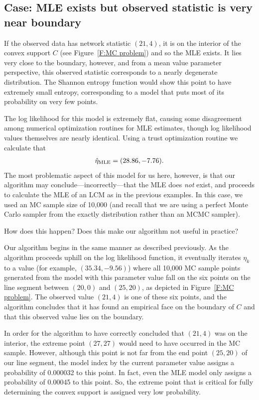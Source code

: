 \subsection{Case: MLE exists but observed statistic is very near boundary} 
\label{S:Example:9node problematic point}
If the observed data has network statistic $(21, 4)$, it is on the interior of 
the convex support $C$ (see Figure~\ref{F:MC problem}) and so the MLE exists.
It lies very close to the boundary, however, and from a mean value parameter 
perspective, this observed statistic 
corresponds to a nearly degenerate distribution. The Shannon entropy function would show this 
point to have extremely small entropy, corresponding to a model that puts most of its 
probability on very few points.

The log likelihood for this model is extremely flat, causing some disagreement among 
numerical optimization routines for MLE estimates, though log likelihood values 
themselves are nearly identical.  Using a trust optimization routine we calculate that 
\begin{align*}
\hat{\eta}_{\textrm{MLE}} = (28.86, -7.76).
\end{align*}
The most problematic aspect of this model for us here, however, is that our algorithm 
may conclude---incorrectly---that the MLE does \emph{not} exist, and proceeds to 
calculate the MLE of an LCM as in the previous examples.  In this case, we used
an MC sample size of 10,000 (and recall that we are using a perfect Monte Carlo sampler
from the exactly distribution rather than an MCMC sampler).

How does this happen?  Does this make our algorithm not useful in practice?

Our algorithm begins in the same manner as described previously.  As the algorithm 
proceeds uphill on the log likelihood function, it eventually iterates $\eta_k$ to a 
value (for example, $(35.34, -9.56)$) where all 10,000 MC sample points generated 
from the model with this parameter value fall on the six points on the line segment 
between $(20,0)$ and $(25,20)$, as depicted in Figure~\ref{F:MC problem}.  
The observed value $(21,4)$ is one of these six points, and the algorithm concludes
that it has found an empirical face on the boundary of $C$ and that 
this observed value lies on the boundary.

In order for the algorithm to have correctly concluded that $(21,4)$ was on the 
interior, the extreme point $(27,27)$ would need to have occurred in the MC sample.  However, although this point is not far from the end point $(25,20)$ of our line
segment, the model index by the current parameter value 
assigns a probability of 0.000032 to this point.  In fact, even the 
MLE model only assigns a probability of 0.00045 to this point.  
So, the extreme point that is critical for fully determining the convex support 
is assigned very low probability.

